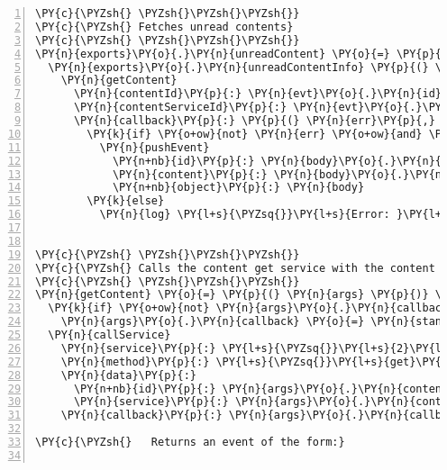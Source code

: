 \begin{Verbatim}[fontsize=\scriptsize,commandchars=\\\{\},numbers=left,firstnumber=1,stepnumber=1]
\PY{c}{\PYZsh{} \PYZsh{}\PYZsh{}\PYZsh{}}
\PY{c}{\PYZsh{} Fetches unread contents}
\PY{c}{\PYZsh{} \PYZsh{}\PYZsh{}\PYZsh{}}
\PY{n}{exports}\PY{o}{.}\PY{n}{unreadContent} \PY{o}{=} \PY{p}{(}\PY{p}{)} \PY{o}{\PYZhy{}}\PY{o}{\PYZgt{}}
  \PY{n}{exports}\PY{o}{.}\PY{n}{unreadContentInfo} \PY{p}{(} \PY{n}{evt} \PY{p}{)} \PY{o}{\PYZhy{}}\PY{o}{\PYZgt{}}
    \PY{n}{getContent}
      \PY{n}{contentId}\PY{p}{:} \PY{n}{evt}\PY{o}{.}\PY{n}{id}
      \PY{n}{contentServiceId}\PY{p}{:} \PY{n}{evt}\PY{o}{.}\PY{n}{serviceId}
      \PY{n}{callback}\PY{p}{:} \PY{p}{(} \PY{n}{err}\PY{p}{,} \PY{n}{resp}\PY{p}{,} \PY{n}{body} \PY{p}{)} \PY{o}{\PYZhy{}}\PY{o}{\PYZgt{}}
        \PY{k}{if} \PY{o+ow}{not} \PY{n}{err} \PY{o+ow}{and} \PY{n}{resp}\PY{o}{.}\PY{n}{statusCode} \PY{o+ow}{is} \PY{l+m+mi}{200}
          \PY{n}{pushEvent}
            \PY{n+nb}{id}\PY{p}{:} \PY{n}{body}\PY{o}{.}\PY{n}{id}
            \PY{n}{content}\PY{p}{:} \PY{n}{body}\PY{o}{.}\PY{n}{text}
            \PY{n+nb}{object}\PY{p}{:} \PY{n}{body}
        \PY{k}{else}
          \PY{n}{log} \PY{l+s}{\PYZsq{}}\PY{l+s}{Error: }\PY{l+s}{\PYZsq{}} \PY{o}{+} \PY{n}{body}\PY{o}{.}\PY{n}{error}\PY{o}{.}\PY{n}{message}


\PY{c}{\PYZsh{} \PYZsh{}\PYZsh{}\PYZsh{}}
\PY{c}{\PYZsh{} Calls the content get service with the content id and the service id provided. }
\PY{c}{\PYZsh{} \PYZsh{}\PYZsh{}\PYZsh{}}
\PY{n}{getContent} \PY{o}{=} \PY{p}{(} \PY{n}{args} \PY{p}{)} \PY{o}{\PYZhy{}}\PY{o}{\PYZgt{}}
  \PY{k}{if} \PY{o+ow}{not} \PY{n}{args}\PY{o}{.}\PY{n}{callback}
    \PY{n}{args}\PY{o}{.}\PY{n}{callback} \PY{o}{=} \PY{n}{standardCallback} \PY{l+s}{\PYZsq{}}\PY{l+s}{getContent}\PY{l+s}{\PYZsq{}}
  \PY{n}{callService}
    \PY{n}{service}\PY{p}{:} \PY{l+s}{\PYZsq{}}\PY{l+s}{2}\PY{l+s}{\PYZsq{}}
    \PY{n}{method}\PY{p}{:} \PY{l+s}{\PYZsq{}}\PY{l+s}{get}\PY{l+s}{\PYZsq{}}
    \PY{n}{data}\PY{p}{:} 
      \PY{n+nb}{id}\PY{p}{:} \PY{n}{args}\PY{o}{.}\PY{n}{contentId}
      \PY{n}{service}\PY{p}{:} \PY{n}{args}\PY{o}{.}\PY{n}{contentServiceId}
    \PY{n}{callback}\PY{p}{:} \PY{n}{args}\PY{o}{.}\PY{n}{callback}

\PY{c}{\PYZsh{}   Returns an event of the form:}


\end{Verbatim}
